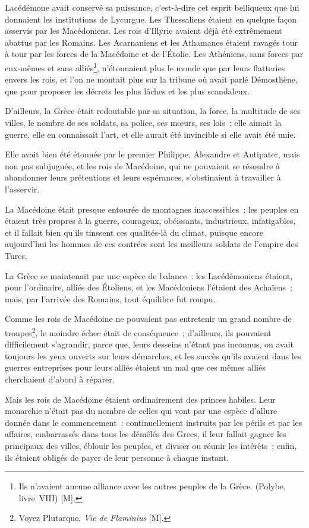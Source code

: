 \documentclass[french,twoside]{book} %
\begin{document}
Lacédémone avait conservé sa puissance, c’est-à-dire cet esprit belliqueux que lui donnaient les institutions de Lycurgue. Les Thessaliens étaient en quelque façon asservis par les Macédoniens. Les rois d’Illyrie avaient déjà été extrêmement abattus par les Romains. Les Acarnaniens et les Athamanes étaient ravagés tour à tour par les forces de la Macédoine et de l’Étolie. Les Athéniens, sans forces par eux-mêmes et sans alliés\footnote{Ils n’avaient aucune alliance avec les autres peuples de la Grèce. (Polybe, livre VIII) [M].}, n’étonnaient plus le monde que par leurs flatteries envers les rois, et l’on ne montait plus sur la tribune où avait parlé Démosthène, que pour proposer les décrets les plus lâches et les plus scandaleux.\par
D’ailleurs, la Grèce était redoutable par sa situation, la force, la multitude de ses villes, le nombre de ses soldats, sa police, ses mœurs, ses lois : elle aimait la guerre, elle en connaissait l’art, et elle aurait été invincible si elle avait été unie.\par
Elle avait bien été étonnée par le premier Philippe, Alexandre et Antipater, mais non pas subjuguée, et les rois de Macédoine, qui ne pouvaient se résoudre à abandonner leurs prétentions et leurs espérances, s’obstinaient à travailler à l’asservir.\par
La Macédoine était presque entourée de montagnes inaccessibles ; les peuples en étaient très propres à la guerre, courageux, obéissants, industrieux, infatigables, et il fallait bien qu’ils tinssent ces qualités-là du climat, puisque encore aujourd’hui les hommes de ces contrées sont les meilleurs soldats de l’empire des Turcs.\par
La Grèce se maintenait par une espèce de balance : les Lacédémoniens étaient, pour l’ordinaire, alliés des Étoliens, et les Macédoniens l’étaient des Achaïens ; mais, par l’arrivée des Romains, tout équilibre fut rompu.\par
Comme les rois de Macédoine ne pouvaient pas entretenir un grand nombre de troupes\footnote{Voyez Plutarque, {\itshape Vie de Flaminius} [M].}, le moindre échec était de conséquence ; d’ailleurs, ils pouvaient difficilement s’agrandir, parce que, leurs desseins n’étant pas inconnus, on avait toujours les yeux ouverts sur leurs démarches, et les succès qu’ils avaient dans les guerres entreprises pour leurs alliés étaient un mal que ces mêmes alliés cherchaient d’abord à réparer.\par
Mais les rois de Macédoine étaient ordinairement des princes habiles. Leur monarchie n’était pas du nombre de celles qui vont par une espèce d’allure donnée dans le commencement : continuellement instruits par les périls et par les affaires, embarrassés dans tous les démêlés des Grecs, il leur fallait gagner les principaux des villes, éblouir les peuples, et diviser ou réunir les intérêts ; enfin, ils étaient obligés de payer de leur personne à chaque instant.\par
\end{document}
